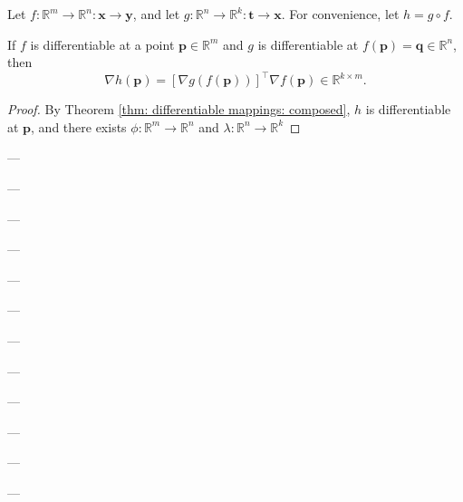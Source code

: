 \begin{theorem}
	\label{thm: chain rule}
	
	Let $f: \mathbb R^m \to \mathbb R^n: \mathbf x \to \mathbf y$, and let $g: \mathbb R^n \to \mathbb R^k: \mathbf t \to \mathbf x$. For convenience, let $h = g \circ f$.
	
	If $f$ is differentiable at a point $\mathbf p \in \mathbb R^m$ and $g$ is differentiable at $f(\mathbf p) = \mathbf q \in \mathbb R^n$, then
	$$
	\nabla h(\mathbf p) = [\nabla g(f(\mathbf p))]^\top \nabla f(\mathbf p) \in \mathbb R^{k \times m}.
	$$
	
	\begin{proof}
		By Theorem \ref{thm: differentiable mappings: composed}, $h$ is differentiable at $\mathbf p$, and there exists $\phi: \mathbb R^m \to \mathbb R^n$ and $\lambda: \mathbb R^n \to \mathbb R^k$
	\end{proof}
\end{theorem}







---

---

---

---

---

---

---

---

---

---

---

---















































%